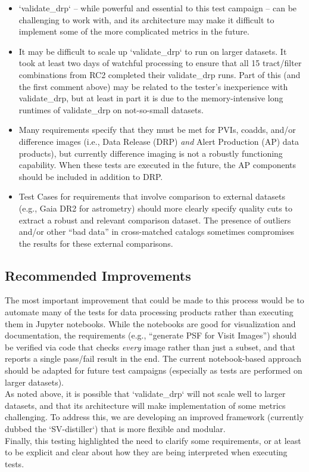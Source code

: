 \documentclass[DM,STR,toc]{lsstdoc}
\providecommand{\tightlist}{
  \setlength{\itemsep}{0pt}\setlength{\parskip}{0pt}}
\begin{document}
\begin{itemize}
\tightlist
\item
  `validate\_drp` -- while powerful and essential to this test campaign
  -- can be challenging to work with, and its architecture may make it
  difficult to implement some of the more complicated metrics in the
  future.
\item
  It may be difficult to scale up `validate\_drp` to run on larger
  datasets. It took at least two days of watchful processing to ensure
  that all 15 tract/filter combinations from RC2 completed their
  validate\_drp runs. Part of this (and the first comment above) may be
  related to the tester's inexperience with validate\_drp, but at least
  in part it is due to the memory-intensive long runtimes of
  validate\_drp on not-so-small datasets.
\item
  Many requirements specify that they must be met for PVIs, coadds,
  and/or difference images (i.e., Data Release (DRP) \emph{and} Alert
  Production (AP) data products), but currently difference imaging is
  not a robustly functioning capability. When these tests are executed
  in the future, the AP components should be included in addition to
  DRP.
\item
  Test Cases for requirements that involve comparison to external
  datasets (e.g., Gaia DR2 for astrometry) should more clearly specify
  quality cuts to extract a robust and relevant comparison dataset. The
  presence of outliers and/or other ``bad data'' in cross-matched
  catalogs sometimes compromises the results for these external
  comparisons.
\end{itemize}


\subsection{Recommended Improvements}
\label{sect:recommendations}

 The most important improvement that could be made to this process would
be to automate many of the tests for data processing products rather
than executing them in Jupyter notebooks. While the notebooks are good
for visualization and documentation, the requirements (e.g., ``generate
PSF for Visit Images'') should be verified via code that checks
\emph{every} image rather than just a subset, and that reports a single
pass/fail result in the end. The current notebook-based approach should
be adapted for future test campaigns (especially as tests are performed
on larger datasets).\\[2\baselineskip]As noted above, it is possible
that `validate\_drp` will not scale well to larger datasets, and that
its architecture will make implementation of some metrics challenging.
To address this, we are developing an improved framework (currently
dubbed the `SV-distiller`) that is more flexible and
modular.\\[2\baselineskip]Finally, this testing highlighted the need to
clarify some requirements, or at least to be explicit and clear about
how they are being interpreted when executing tests.
\end{document}
